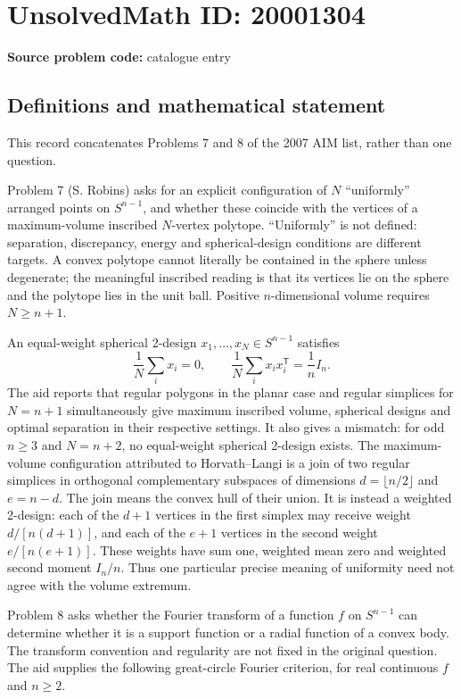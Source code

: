 \documentclass[11pt]{article}
\begin{document}
\section*{UnsolvedMath ID: 20001304}
\textbf{Source problem code:} catalogue entry
\subsection{Definitions and mathematical statement}
This record concatenates Problems 7 and 8 of the 2007 AIM list, rather than one question.

Problem 7 (S. Robins) asks for an explicit configuration of \(N\) ``uniformly'' arranged points on \(S^{n-1}\), and whether these coincide with the vertices of a maximum-volume inscribed \(N\)-vertex polytope. ``Uniformly'' is not defined: separation, discrepancy, energy and spherical-design conditions are different targets. A convex polytope cannot literally be contained in the sphere unless degenerate; the meaningful inscribed reading is that its vertices lie on the sphere and the polytope lies in the unit ball. Positive \(n\)-dimensional volume requires \(N\ge n+1\).

An equal-weight spherical 2-design \(x_1,\ldots,x_N\in S^{n-1}\) satisfies
\[
\frac1N\sum_i x_i=0,\qquad\frac1N\sum_i x_ix_i^{\mathsf T}=\frac1n I_n.
\]
The aid reports that regular polygons in the planar case and regular simplices for \(N=n+1\) simultaneously give maximum inscribed volume, spherical designs and optimal separation in their respective settings. It also gives a mismatch: for odd \(n\ge3\) and \(N=n+2\), no equal-weight spherical 2-design exists. The maximum-volume configuration attributed to Horvath--Langi is a join of two regular simplices in orthogonal complementary subspaces of dimensions \(d=\lfloor n/2\rfloor\) and \(e=n-d\). The join means the convex hull of their union. It is instead a weighted 2-design: each of the \(d+1\) vertices in the first simplex may receive weight \(d/[n(d+1)]\), and each of the \(e+1\) vertices in the second weight \(e/[n(e+1)]\). These weights have sum one, weighted mean zero and weighted second moment \(I_n/n\). Thus one particular precise meaning of uniformity need not agree with the volume extremum.

Problem 8 asks whether the Fourier transform of a function \(f\) on \(S^{n-1}\) can determine whether it is a support function or a radial function of a convex body. The transform convention and regularity are not fixed in the original question. The aid supplies the following great-circle Fourier criterion, for real continuous \(f\) and \(n\ge2\).
\end{document}
